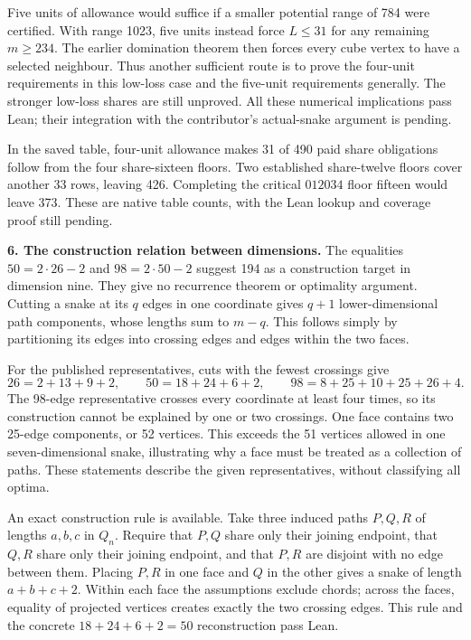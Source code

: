\documentclass[11pt,a4paper]{article}
\begin{document}
Five units of allowance would suffice if a smaller potential range of
784 were certified. With range 1023, five units instead force $L\le31$
for any remaining $m\ge234$. The earlier domination theorem then forces
every cube vertex to have a selected neighbour. Thus another sufficient
route is to prove the four-unit requirements in this low-loss case and
the five-unit requirements generally. The stronger low-loss shares are
still unproved. All these numerical implications pass Lean; their
integration with the contributor's actual-snake argument is pending.

In the saved table, four-unit allowance makes 31 of 490 paid share
obligations follow from the four share-sixteen floors. Two established
share-twelve floors cover another 33 rows, leaving 426. Completing the
critical $012034$ floor fifteen would leave 373. These are native table
counts, with the Lean lookup and coverage proof still pending.

\textbf{6. The construction relation between dimensions.}
The equalities $50=2\cdot26-2$ and $98=2\cdot50-2$ suggest 194 as
a construction target in dimension nine. They give no recurrence
theorem or optimality argument. Cutting a snake at its $q$ edges in
one coordinate gives $q+1$ lower-dimensional path components, whose
lengths sum to $m-q$. This follows simply by partitioning its edges
into crossing edges and edges within the two faces.

For the published representatives, cuts with the fewest crossings give
\[
26=2+13+9+2,\qquad
50=18+24+6+2,\qquad
98=8+25+10+25+26+4.
\]
The 98-edge representative crosses every coordinate at least four
times, so its construction cannot be explained by one or two crossings.
One face contains two 25-edge components, or 52 vertices. This exceeds
the 51 vertices allowed in one seven-dimensional snake, illustrating
why a face must be treated as a collection of paths. These statements
describe the given representatives, without classifying all optima.

An exact construction rule is available. Take three induced paths
$P,Q,R$ of lengths $a,b,c$ in $Q_n$. Require that $P,Q$ share only
their joining endpoint, that $Q,R$ share only their joining endpoint,
and that $P,R$ are disjoint with no edge between them. Placing $P,R$
in one face and $Q$ in the other gives a snake of length $a+b+c+2$.
Within each face the assumptions exclude chords; across the faces,
equality of projected vertices creates exactly the two crossing edges.
This rule and the concrete $18+24+6+2=50$ reconstruction pass Lean.
\end{document}
